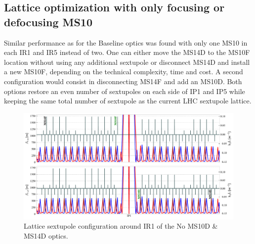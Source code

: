 \documentclass{cernatsnote}
\begin{document}
\clearpage

\subsection{Lattice optimization with only focusing or defocusing MS10}

Similar performance as for the Baseline optics was found with only one MS10 in each IR1 and IR5 instead of two. One can either move the MS14D to the MS10F location without using any additional sextupole or disconnect MS14D and install a new MS10F, depending on the technical complexity, time and cost. A second configuration would consist in disconnecting MS14F and add an MS10D. Both options restore an even number of sextupoles on each side of IP1 and IP5 while keeping the same total number of sextupole as the current LHC sextupole lattice. 

\begin{figure}[h!]
\centering
\includegraphics[width=1\textwidth]{images/twiss_k2l_noms10fdms14fd_b1.pdf}
\caption{\label{fig_twiss_all} Lattice sextupole configuration around IR1 of the No MS10D \& MS14D optics.}
\end{figure}
\end{document}
